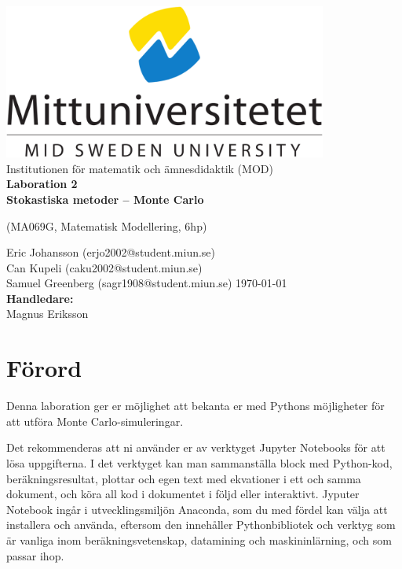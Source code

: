 \documentclass[a4paper]{article}
\makeatletter
\newcommand{\getauthor}{Eric Johansson (erjo2002@student.miun.se)\\
                        Can Kupeli (caku2002@student.miun.se)\\
                        Samuel Greenberg (sagr1908@student.miun.se)} %
\newcommand{\gettitle}{Laboration 2 \\ Stokastiska metoder -- Monte Carlo} %
\newcommand{\getcourse}{(MA069G, Matematisk Modellering, 6hp)} %
\newcommand{\getsupervisor}{Magnus Eriksson}
\makeatother
\begin{document}
\begin{titlepage}
    \begin{center}
        \vspace*{1cm}
        \includegraphics[width=0.8\textwidth]{msu.png}\\[0.5cm]
        \Large
        Institutionen för matematik och ämnesdidaktik (MOD)\\[1cm]
        \Huge
        \textbf{\gettitle}

        \large
        \getcourse{}

        \vspace{1cm}
        \getauthor{}
        \Large
        \vfill
        \vspace{0.8cm}
        \small
        \today \\
        \Large
        \textbf{Handledare:}\\
        \getsupervisor{}
    \end{center}
\end{titlepage}

\tableofcontents
\newpage

\section{Förord}
Denna laboration ger er möjlighet att bekanta er med Pythons
möjligheter för att utföra Monte Carlo-simuleringar.

Det rekommenderas att ni använder er av verktyget Jupyter Notebooks för att lösa
uppgifterna. I det verktyget kan man sammanställa block med Python-kod, beräkningsresultat,
plottar och egen text med ekvationer i ett och samma dokument, och köra all kod i dokumentet
i följd eller interaktivt. Jyputer Notebook ingår i utvecklingsmiljön Anaconda, som du med
fördel kan välja att installera och använda, eftersom den innehåller Pythonbibliotek och
verktyg som är vanliga inom beräkningsvetenskap, datamining och maskininlärning, och som passar ihop.
\end{document}
